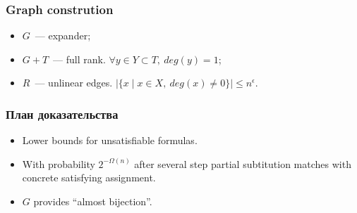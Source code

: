 \begin{frame}
    \frametitle{Graph constrution}

    \pause
    

    \begin{itemize}
	    \item $G$~--- expander;
   		\pause
        \pause
        \item $G + T$~--- full rank. $\forall y \in Y \subset T, ~
		    deg(y) = 1$;
        \pause
        \pause
        \item $R$~--- unlinear edges. $|\{x \mid x \in X, ~ deg(x)
		    \ne 0\}| \le n^{\epsilon}$.
    \end{itemize}
\end{frame}

\begin{frame}
	\frametitle{План доказательства}

	\begin{itemize}
		\pause
		\item Lower bounds for unsatisfiable formulas.
		\pause
		\item With probability $2^{-\Omega(n)}$ after several step
    		partial subtitution matches with concrete satisfying
            assignment.
		\pause
		\item $G$ provides ``almost bijection''.
	\end{itemize}
   
\end{frame}